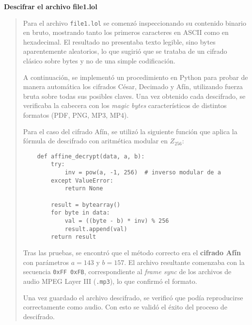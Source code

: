 \textbf{Descifrar el archivo file1.lol}
\begin{quote}
    Para el archivo \texttt{file1.lol} se comenzó inspeccionando su contenido binario en bruto,
    mostrando tanto los primeros caracteres en ASCII como en hexadecimal. El resultado
    no presentaba texto legible, sino bytes aparentemente aleatorios, lo que sugirió que se
    trataba de un cifrado clásico sobre bytes y no de una simple codificación.

    A continuación, se implementó un procedimiento en Python para probar de manera
    automática los cifrados César, Decimado y Afín, utilizando fuerza bruta sobre todas sus
    posibles claves. Una vez obtenido cada descifrado, se verificaba la cabecera con los
    \textit{magic bytes} característicos de distintos formatos (PDF, PNG, MP3, MP4).

    Para el caso del cifrado Afín, se utilizó la siguiente función que aplica la fórmula de
    descifrado con aritmética modular en $Z_{256}$:

    \vspace{.3cm}
    \begin{verbatim}
    def affine_decrypt(data, a, b):
        try:
            inv = pow(a, -1, 256)  # inverso modular de a
        except ValueError:
            return None
    
        result = bytearray()
        for byte in data:
            val = ((byte - b) * inv) % 256
            result.append(val)
        return result
    \end{verbatim}
    \vspace{.3cm}
    
    Tras las pruebas, se encontró que el método correcto era el \textbf{cifrado Afín} con
    parámetros $a=143$ y $b=157$. El archivo resultante comenzaba con la secuencia
    \texttt{0xFF 0xFB}, correspondiente al \textit{frame sync} de los archivos de audio MPEG
    Layer III (\texttt{.mp3}), lo que confirmó el formato.

    Una vez guardado el archivo descifrado, se verificó que podía reproducirse
    correctamente como audio. Con esto se validó el éxito del proceso de descifrado.
\end{quote}
\vspace{.5cm}

